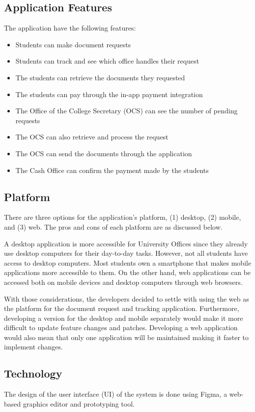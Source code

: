 \subsection{Application Features}
The application have the following features:
\begin{itemize}
   \item Students can make document requests
   \item Students can track and see which office handles their request
   \item The students can retrieve the documents they requested
   \item The students can pay through the in-app payment integration
   \item The Office of the College Secretary (OCS) can see the number of pending requests
   \item The OCS can also retrieve and process the request
   \item The OCS can send the documents through the application
   \item The Cash Office can confirm the payment made by the students
\end{itemize}

\subsection{Platform}
There are three options for the application’s platform, (1) desktop, (2) mobile, and (3) web. The pros and cons of each platform are as discussed below.

A desktop application is more accessible for University Offices since they already use desktop computers for their day-to-day tasks. However, not all students have access to desktop computers. Most students own a smartphone that makes mobile applications more accessible to them. On the other hand, web applications can be accessed both on mobile devices and desktop computers through web browsers.

With those considerations, the developers decided to settle with using the web as the platform for the document request and tracking application. Furthermore, developing a version for the desktop and mobile separately would make it more difficult to update feature changes and patches. Developing a web application would also mean that only one application will be maintained making it faster to implement changes.
\subsection{Technology}
The design of the user interface (UI) of the system is done using Figma, a web-based graphics editor and prototyping tool.

